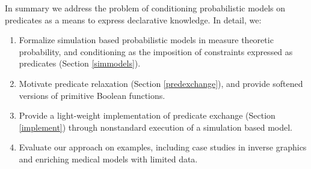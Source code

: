 In summary we address the problem of conditioning probabilistic models on predicates as a means to express declarative knowledge.
In detail, we:

\begin{enumerate}
	\item Formalize simulation based probabilistic models in measure theoretic probability, and conditioning as the imposition of constraints expressed as predicates (Section \ref{simmodels}).
	\item Motivate predicate relaxation (Section \ref{predexchange}), and provide softened versions of primitive Boolean functions. 
	\item Provide a light-weight implementation of predicate exchange (Section \ref{implement}) through nonstandard execution of a simulation based model.
	\item Evaluate our approach on examples, including case studies in inverse graphics and enriching medical models with limited data.
\end{enumerate}



